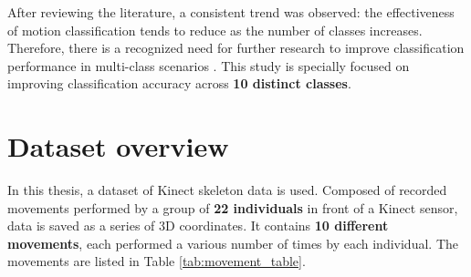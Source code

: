       \vspace{0.5cm}
      
      After reviewing the literature, a consistent trend was observed: the effectiveness of motion classification tends to reduce as the number of classes increases. Therefore, there is a recognized need for further research to improve classification performance in multi-class scenarios \cite{acis_classification_2023}. This study is specially focused on improving classification accuracy across \textbf{10 distinct classes}.

   \section{Dataset overview}
      
      In this thesis, a dataset of Kinect skeleton data is used. Composed of recorded movements performed by a group of \textbf{22 individuals} in front of a Kinect sensor, data is saved as a series of 3D coordinates. It contains \textbf{10 different movements}, each performed a various number of times by each individual. The movements are listed in Table \ref{tab:movement_table}.

      \newpage

